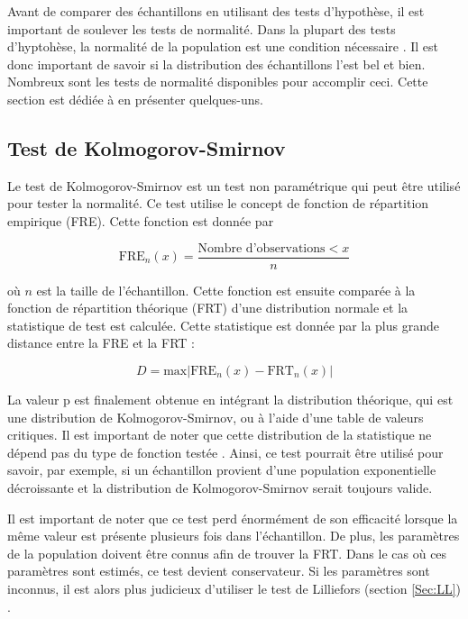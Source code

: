 \documentclass{article}       %
\begin{document}
Avant de comparer des échantillons en utilisant des tests d'hypothèse, il est important de soulever les tests de normalité. Dans la plupart des tests d'hyptohèse, la normalité de la population est une condition nécessaire \cite{GComp}. Il est donc important de savoir si la distribution des échantillons l'est bel et bien. Nombreux sont les tests de normalité disponibles pour accomplir ceci. Cette section est dédiée à en présenter quelques-uns.

\subsection{Test de Kolmogorov-Smirnov}

Le test de Kolmogorov-Smirnov est un test non paramétrique qui peut être utilisé pour tester la normalité. Ce test utilise le concept de fonction de répartition empirique (FRE). Cette fonction est donnée par \cite{GComp}

\begin{equation*}
    \text{FRE}_{n}(x) = \frac{\text{Nombre d'observations} < x}{n}
\end{equation*}

où $n$ est la taille de l'échantillon. Cette fonction est ensuite comparée à la fonction de répartition théorique (FRT) d'une distribution normale et la statistique de test est calculée. Cette statistique est donnée par la plus grande distance entre la FRE et la FRT \cite{KS}:

\begin{equation}
\label{Eq:KS}
    D = \text{max}\left|\text{FRE}_{n}(x) - \text{FRT}_{n}(x)\right|
\end{equation}

La valeur p est finalement obtenue en intégrant la distribution théorique, qui est une distribution de Kolmogorov-Smirnov, ou à l'aide d'une table de valeurs critiques. Il est important de noter que cette distribution de la statistique ne dépend pas du type de fonction testée \cite{AD}. Ainsi, ce test pourrait être utilisé pour savoir, par exemple, si un échantillon provient d'une population exponentielle décroissante et la distribution de Kolmogorov-Smirnov serait toujours valide.

Il est important de noter que ce test perd énormément de son efficacité lorsque la même valeur est présente plusieurs fois dans l'échantillon. De plus, les paramètres de la population doivent être connus afin de trouver la FRT. Dans le cas où ces paramètres sont estimés, ce test devient conservateur. Si les paramètres sont inconnus, il est alors plus judicieux d'utiliser le test de Lilliefors (section \ref{Sec:LL}) \cite{LL}.
\end{document}
